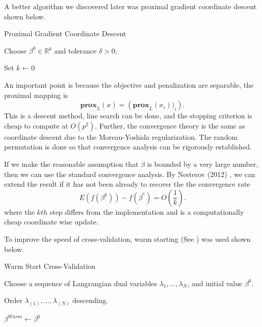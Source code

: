 \documentclass[12pt, a4paper, reqno]{article}
\numberwithin{equation}{section}
\newcommand{\R}{\mathbb{R}}
\begin{document}
A better algorithm we discovered later was proximal gradient coordinate descent shown below.

\vspace{.5cm}
\begin{algorithm}[H]
\caption{Proximal Gradient Coordinate Descent}
Choose $\beta^0 \in \R^p$ and tolerance $\delta > 0$;

Set $k \gets 0$

\end{algorithm}
\vspace{.5cm}

An important point is because the objective and penalization are separable, the proximal mapping is
\[
\textbf{prox}_{L}(x) = \left( \textbf{prox}_{L}(x_i))_i \right). 
\]
This is a descent method, line search can be done, and the stopping criterion is cheap to compute at $O(p^2)$.
Further, the convergence theory is the same as coordinate descent due to the Moreau-Yoshida regularization.
The random permutation is done so that convergence analysis can be rigorously established.

If we make the reasonable assumption that $\beta$ is bounded by a very large number, then we can use the standard convergence analysis.
By Nesterov (2012) \cite{nesterov2}, we can extend the result if it has not been already to recover the the convergence rate
\[
E(f(\beta^k)) - f(\beta^{*})  = O(\frac{1}{k}).
\]
where the $kth$ step differs from the implementation and is a computationally cheap coordinate wise update. 

To improve the speed of cross-validation, warm starting (See \cite{glmnet}) was used shown below.

\vspace{.5cm}
\begin{algorithm}[H]
\caption{Warm Start Cross-Validation}
Choose a sequence of Langrangian dual variables $\lambda_1, \ldots, \lambda_N$, and initial value $\beta^0$.

Order $\lambda_{(1)}, \ldots, \lambda_{(N)}$ descending.

$\beta^{Warm} \gets \beta^0$ 


\end{algorithm}
\vspace{.5cm}
\end{document}
